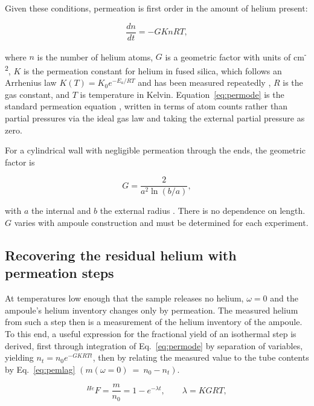 Given these conditions, permeation is first order in the amount of helium present:

\begin{equation}
\label{eq:permode}
\frac{dn}{dt} = -GKnRT ,
\end{equation}
 
where $n$ is the number of helium atoms, $G$ is a geometric factor with units of cm\textsuperscript{-2}, $K$ is the permeation constant for helium in fused silica, which follows an Arrhenius law $K(T) = K_{0}e^{-E_{a}/RT}$ and has been measured repeatedly \citep{norton1953,altemose1961,swets1961,masaryk1968}, $R$ is the gas constant, and $T$ is temperature in Kelvin. Equation~\eqref{eq:permode} is the standard permeation equation \citep{norton1953,altemose1961,swets1961,masaryk1968}, written in terms of atom counts rather than partial pressures via the ideal gas law and taking the external partial pressure as zero. 

For a cylindrical wall with negligible permeation through the ends, the geometric factor is 

\begin{equation}
\label{eq:geomfactor}
G = \frac{2}{a^{2}\ln(b/a)} ,
\end{equation}

with $a$ the internal and $b$ the external radius \citep{masaryk1968}. There is no dependence on length. $G$ varies with ampoule construction and must be determined for each experiment.

\subsection{Recovering the residual helium with permeation steps}\label{sec:permeation-steps}

At temperatures low enough that the sample releases no helium, $\omega = 0$ and the ampoule's helium inventory changes only by permeation. The measured helium from such a step then is a measurement of the helium inventory of the ampoule. To this end, a useful expression for the fractional yield of an isothermal step is derived, first through integration of Eq.~\eqref{eq:permode} by separation of variables, yielding $n_t = n_0e^{-GKRTt}$, then by relating the measured value to the tube contents by Eq.~\eqref{eq:pemlag} $\left(m(\omega=0)~=~n_0-n_t\right)$.

\begin{equation}
\label{eq:permsol}
^{He}F = \frac{m}{n_{0}} = 1 - e^{-\lambda t} , \qquad \lambda = KGRT ,
\end{equation}

